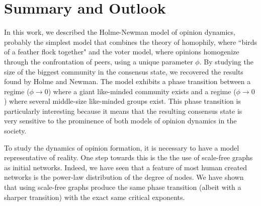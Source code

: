 \documentclass[11pt]{article}
\begin{document}
\section{Summary and Outlook} 
\label{conclusion}
In this work, we described the Holme-Newman model of opinion dynamics, probably the simplest model that combines the theory of homophily, where ``birds of a feather flock together" and the voter model, where opinions homogenize through the confrontation of peers, using a unique parameter $\phi$. By studying the size of the biggest community in the consensus state, we recovered the results found by Holme and Newman. The model exhibits a phase transition between a regime ($\phi\rightarrow0$) where a giant like-minded community exists and a regime ($\phi\rightarrow0$) where several middle-size like-minded groups exist. This phase transition is particularly interesting because it means that the resulting consensus state is very sensitive to the prominence of both models of opinion dynamics in the society. 

To study the dynamics of opinion formation, it is necessary to have a model representative of reality. One step towards this is the the use of scale-free graphs as initial networks. Indeed, we have seen that a feature of most human created networks is the power-law distribution of the degree of nodes. We have shown that using scale-free graphs produce the same phase transition (albeit with a sharper transition) with the exact same critical exponents.
\end{document}
